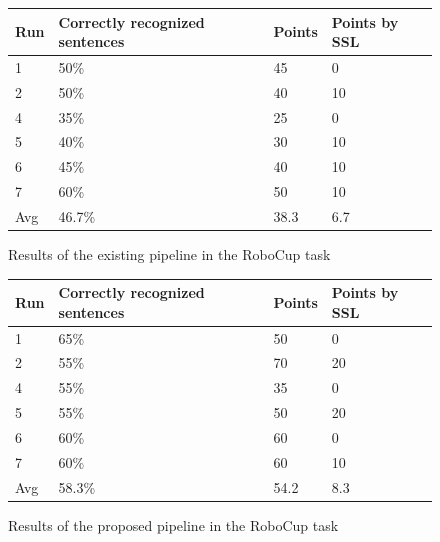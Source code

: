 \begin{figure}[]
	\begin{tabular}{ | l | l | l | l |}
		\hline
		Run & Correctly recognized sentences & Points & Points by SSL \\ \hline
		1 & 50\% & 45 & 0 \\ \hline
		2 & 50\% & 40 & 10 \\ \hline
		4 & 35\% & 25 &  0 \\ \hline
		5 & 40\% & 30 & 10 \\ \hline
		6 & 45\% & 40 & 10 \\ \hline
		7 & 60\% & 50 & 10 \\ \hhline{|=|=|=|=|} 
		Avg & 46.7\% & 38.3 & 6.7 \\
		\hline
	\end{tabular}
	\caption{Results of the existing pipeline in the RoboCup task}
	\label{pic:eval_task_results_old}
\end{figure}

\begin{figure}[ht]
	\begin{tabular}{ | l | l | l | l |}
		\hline
		Run & Correctly recognized sentences & Points & Points by SSL \\ \hline
		1 & 65\% & 50 &  0 \\ \hline
		2 & 55\% & 70 & 20 \\ \hline
		4 & 55\% & 35 &  0 \\ \hline
		5 & 55\% & 50 & 20 \\ \hline
		6 & 60\% & 60 &  0 \\ \hline
		7 & 60\% & 60 & 10 \\ \hhline{|=|=|=|=|} 
		Avg & 58.3\% & 54.2 & 8.3\\
		\hline
	\end{tabular}
	\caption{Results of the proposed pipeline in the RoboCup task}
	\label{pic:eval_task_results_new}
\end{figure}